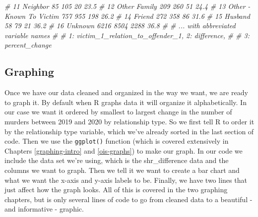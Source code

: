 \documentclass[
]{krantz}
\makeatletter
\newenvironment{Shaded}{\begin{snugshade}}{\end{snugshade}}
\newcommand{\CommentTok}[1]{\textcolor[rgb]{0.37,0.37,0.37}{\textit{#1}}}
\newenvironment{kframe}{%
\medskip{}
\setlength{\fboxsep}{.8em}
 \def\at@end@of@kframe{}%
 \ifinner\ifhmode%
  \def\at@end@of@kframe{\end{minipage}}%
  \begin{minipage}{\columnwidth}%
 \fi\fi%
 \def\FrameCommand##1{\hskip\@totalleftmargin \hskip-\fboxsep
 \colorbox{shadecolor}{##1}\hskip-\fboxsep
     \hskip-\linewidth \hskip-\@totalleftmargin \hskip\columnwidth}%
 \MakeFramed {\advance\hsize-\width
   \@totalleftmargin\z@ \linewidth\hsize
   \@setminipage}}%
 {\par\unskip\endMakeFramed%
 \at@end@of@kframe}
\renewenvironment{Shaded}{\begin{kframe}}{\end{kframe}}
\makeatother
\begin{document}
\begin{Shaded}
\begin{Highlighting}[]
\CommentTok{\# 11 Neighbor                        85    105      20   23.5 }
\CommentTok{\# 12 Other Family                   209    260      51   24.4 }
\CommentTok{\# 13 Other {-} Known To Victim        757    955     198   26.2 }
\CommentTok{\# 14 Friend                         272    358      86   31.6 }
\CommentTok{\# 15 Husband                         58     79      21   36.2 }
\CommentTok{\# 16 Unknown                       6216   8504    2288   36.8 }
\CommentTok{\# \# ... with abbreviated variable names}
\CommentTok{\# \#   1: victim\_1\_relation\_to\_offender\_1, 2: difference,}
\CommentTok{\# \#   3: percent\_change}
\end{Highlighting}
\end{Shaded}

\hypertarget{graphing}{%
\subsection{Graphing}\label{graphing}}

Once we have our data cleaned and organized in the way we
want, we are ready to graph it. By default when R graphs
data it will organize it alphabetically. In our case we want
it ordered by smallest to largest change in the number of
murders between 2019 and 2020 by relationship type. So we
first tell R to order it by the relationship type variable,
which we've already sorted in the last section of code. Then
we use the \texttt{ggplot()} function (which is covered
extensively in Chapters \ref{graphing-intro} and
\ref{ois-graphs}) to make our graph. In our code we include
the data set we're using, which is the shr\_difference data
and the columns we want to graph. Then we tell it we want to
create a bar chart and what we want the x-axis and y-axis
labels to be. Finally, we have two lines that just affect
how the graph looks. All of this is covered in the two
graphing chapters, but is only several lines of code to go
from cleaned data to a beautiful - and informative -
graphic.
\end{document}
